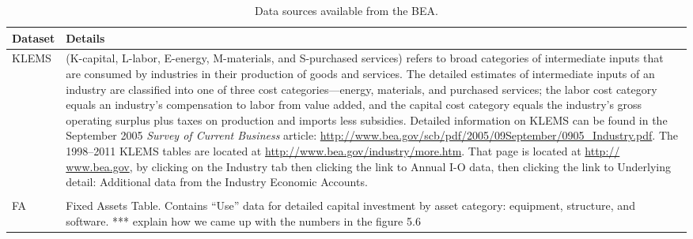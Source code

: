 \begin{table}
\caption[Data sources available from the BEA]{Data sources available from the BEA.}
\begin{center}
  \begin{tabular}{l @{\hspace{2em}} p{10cm}}
   \toprule 
    Dataset & Details  \\ 

	\midrule
KLEMS &
(K-capital, L-labor, E-energy, M-materials, and S-purchased services) refers to broad categories of intermediate inputs that are consumed by industries in their production of goods and services.  The detailed estimates of intermediate inputs of an industry are classified into one of three cost categories—energy, materials, and purchased services; the labor cost category equals an industry’s compensation to labor from value added, and the capital cost category equals the industry’s gross operating surplus plus taxes on production and imports less subsidies.  Detailed information on KLEMS can be found in the September 2005 \emph{ Survey of Current Business} article: \url{http://www.bea.gov/scb/pdf/2005/09September/0905\_Industry.pdf}. The 1998--2011 KLEMS tables are located at 
\url{ http://www.bea.gov/industry/more.htm}. That page is located at \url{http:// www.bea.gov}, by clicking on the Industry tab then clicking the link to Annual I-O data, then clicking the link to Underlying detail: Additional data from the Industry Economic Accounts. \\
 & \\
FA & 
Fixed Assets Table. Contains “Use” data for detailed capital investment by asset category: equipment, structure, and software.   *** explain how we came up with the numbers in the figure 5.6


\end{tabular}
\end{center}
\end{table}
